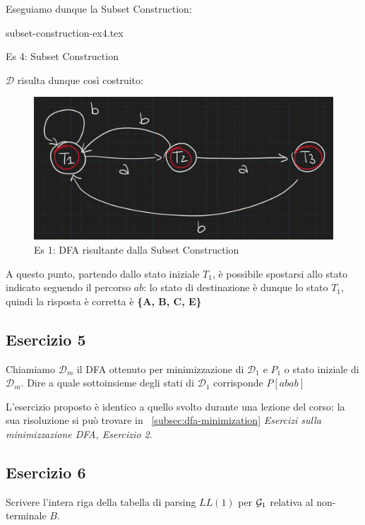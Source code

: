 \documentclass[class=book, crop=false, oneside, 12pt]{standalone}
\begin{document}
Eseguiamo dunque la Subset Construction:

\begin{table}[H]
    \centering
    {subset-construction-ex4.tex}
    \caption{Es 4: Subset Construction}
    \label{tab:subset-construction-ex4}
\end{table}

\(\mathcal{D}\) risulta dunque così costruito:

\begin{figure}[H]
	\centering
    \includegraphics[width=.8\textwidth]{sc-ex4.jpg}
    \caption{Es 1: DFA risultante dalla Subset Construction}
    \label{fig:sc-ex4}
\end{figure}

A questo punto, partendo dallo stato iniziale \(T_1\), è possibile spostarsi allo stato indicato seguendo il percorso \(ab\): lo stato di destinazione è dunque lo stato \(T_1\), quindi la risposta è corretta è \textbf{\{A, B, C, E\}}

\subsection{Esercizio 5}

Chiamiamo \(\mathcal{D}_m\) il  DFA  ottenuto  per  minimizzazione  di \(\mathcal{D}_1\) e \(P_1\) o  stato  iniziale  di \(\mathcal{D}_m\). Dire a quale sottoinsieme degli stati di \(\mathcal{D}_1\) corrisponde \(P[abab]\)

L'esercizio proposto è identico a quello svolto durante una lezione del corso: la sua risoluzione si può trovare in ~\ref{subsec:dfa-minimization} \emph{Esercizi sulla minimizzazione DFA, Esercizio 2}.

\subsection{Esercizio 6}

Scrivere l’intera riga della tabella di parsing \(LL(1)\) per \(\mathcal{G}_1\) relativa al non-terminale \(B\).
\end{document}

